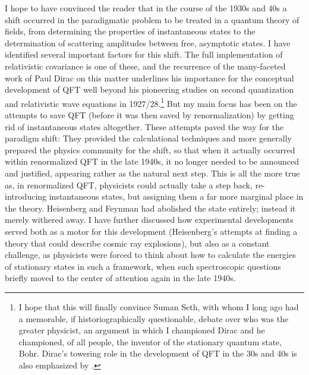 \documentclass[12pt]{article}
\begin{document}
I hope to have convinced the reader that in the course of the 1930s and 40s a shift occurred in the paradigmatic problem to be treated in a quantum theory of fields, from determining the properties of instantaneous states to the determination of scattering amplitudes between free, asymptotic states. I have identified several important factors for this shift. The full implementation of relativistic covariance is one of these, and the recurrence of the many-faceted work of Paul Dirac on this matter underlines his importance for the conceptual development of QFT well beyond his pioneering studies on second quantization and relativistic wave equations in 1927/28.\footnote{I hope that this will finally convince Suman Seth, with whom I long ago had a memorable, if historiographically questionable, debate over who was the greater physicist, an argument in which I championed Dirac and he championed, of all people, the inventor of the stationary quantum state, Bohr. Dirac's towering role in the development of QFT in the 30s and 40s is also emphasized by \cite[p. 573]{schweber_1994_qed}.} But my main focus has been on the attempts to save QFT (before it was then saved by renormalization) by getting rid of instantaneous states altogether. These attempts paved the way for the paradigm shift: They provided the calculational techniques and more generally prepared the physics community for the shift, so that when it actually occurred within renormalized QFT in the late 1940s, it no longer needed to be announced and justified, appearing rather as the natural next step. This is all the more true as, in renormalized QFT, physicists could actually take a step back, re-introducing instantaneous states, but assigning them a far more marginal place in the theory. Heisenberg and Feynman had abolished the state entirely; instead it merely withered away. I have further discussed how experimental developments served both as a motor for this development (Heisenberg's attempts at finding a theory that could describe cosmic ray explosions), but also as a constant challenge, as physicists were forced to think about how to calculate the energies of stationary states in such a framework, when such spectroscopic questions briefly moved to the center of attention again in the late 1940s.
\end{document}
